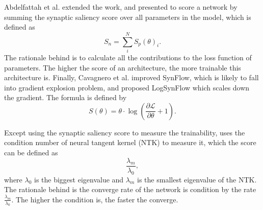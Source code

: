 \documentclass[sigconf]{acmart}
\begin{document}
    Abdelfattah et al. \cite{abdelfattah2021zerocost} extended the work, and presented to score a 
    network by summing the synaptic saliency score over all parameters in the model, which is 
    defined as 
    \begin{equation}
        \label{equ:zero_cost}
        S_n=\sum^N_i S_p(\theta)_i.
    \end{equation}
    The rationale behind is to calculate all the contributions to the loss function of parameters. 
    The higher the score of an architecture, the more trainable this architecture is. 
    Finally, Cavagnero et al. \cite{Cavagnero_2023} improved SynFlow, which is likely to fall into 
    gradient explosion problem, and proposed LogSynFlow which scales down the gradient. 
    The formula is defined by 
    \begin{equation}
        \label{equ:logsynflow}
        S(\theta)=\theta\cdot\log(\frac{\partial \mathcal L}{\partial \theta}+1).
    \end{equation}

    Except using the synaptic saliency score to measure the trainability, 
    \cite{https://doi.org/10.48550/arxiv.2102.11535} uses the condition number of neural tangent 
    kernel (NTK) \cite{jacot2020neural} to measure it, which the score can be defined as 
    \begin{equation}
        \label{equ:cn_ntk}
        \frac{\lambda_m}{\lambda_0}, 
    \end{equation}
    where $\lambda_0$ is the biggest eigenvalue and $\lambda_m$ is the smallest eigenvalue of the 
    NTK. The rationale behind is the converge rate of the network is condition by the rate 
    $\frac{\lambda_m}{\lambda_0}$. The higher the condition is, the faster the converge. 
\end{document}
